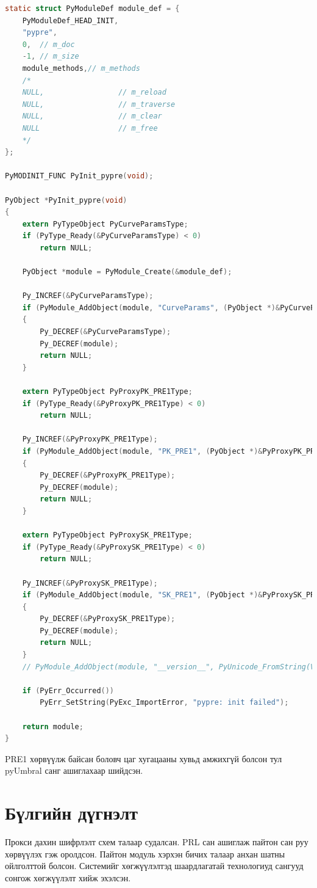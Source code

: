 \begin{lstlisting}[language=C, caption={Модуль нь init хийхэд зарлах классууд}]
static struct PyModuleDef module_def = {
    PyModuleDef_HEAD_INIT,
    "pypre",
    0,  // m_doc
    -1, // m_size
    module_methods,// m_methods
    /*
    NULL,                 // m_reload
    NULL,                 // m_traverse
    NULL,                 // m_clear
    NULL                  // m_free
    */
};

PyMODINIT_FUNC PyInit_pypre(void);

PyObject *PyInit_pypre(void)
{
    extern PyTypeObject PyCurveParamsType;
    if (PyType_Ready(&PyCurveParamsType) < 0)
        return NULL;

    PyObject *module = PyModule_Create(&module_def);

    Py_INCREF(&PyCurveParamsType);
    if (PyModule_AddObject(module, "CurveParams", (PyObject *)&PyCurveParamsType) < 0)
    {
        Py_DECREF(&PyCurveParamsType);
        Py_DECREF(module);
        return NULL;
    }

    extern PyTypeObject PyProxyPK_PRE1Type;
    if (PyType_Ready(&PyProxyPK_PRE1Type) < 0)
        return NULL;

    Py_INCREF(&PyProxyPK_PRE1Type);
    if (PyModule_AddObject(module, "PK_PRE1", (PyObject *)&PyProxyPK_PRE1Type) < 0)
    {
        Py_DECREF(&PyProxyPK_PRE1Type);
        Py_DECREF(module);
        return NULL;
    }

    extern PyTypeObject PyProxySK_PRE1Type;
    if (PyType_Ready(&PyProxySK_PRE1Type) < 0)
        return NULL;

    Py_INCREF(&PyProxySK_PRE1Type);
    if (PyModule_AddObject(module, "SK_PRE1", (PyObject *)&PyProxySK_PRE1Type) < 0)
    {
        Py_DECREF(&PyProxySK_PRE1Type);
        Py_DECREF(module);
        return NULL;
    }
    // PyModule_AddObject(module, "__version__", PyUnicode_FromString(VERSION));

    if (PyErr_Occurred())
        PyErr_SetString(PyExc_ImportError, "pypre: init failed");

    return module;
}
\end{lstlisting}

\noindent PRE1 хөрвүүлж байсан боловч цаг хугацааны хувьд амжихгүй болсон тул pyUmbral санг ашиглахаар шийдсэн.

\section{Бүлгийн дүгнэлт}
Прокси дахин шифрлэлт схем талаар судалсан. PRL сан ашиглаж пайтон сан руу хөрвүүлэх гэж оролдсон. Пайтон модуль хэрхэн бичих талаар анхан шатны ойлголттой болсон.
Системийг хөгжүүлэлтэд шаардлагатай технологиуд сангууд сонгож хөгжүүлэлт хийж эхэлсэн.
